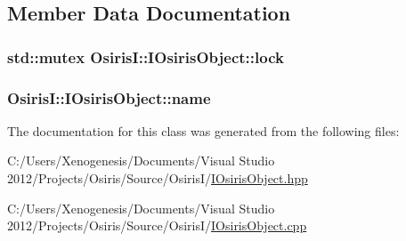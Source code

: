 \subsection{Member Data Documentation}
\hypertarget{class_osiris_i_1_1_i_osiris_object_a665623f1dafeec47b919f298a631ea61}{
\subsubsection[{lock}]{\setlength{\rightskip}{0pt plus 5cm}std\-::mutex Osiris\-I\-::\-I\-Osiris\-Object\-::lock\hspace{0.3cm}{\ttfamily [protected]}}}\label{class_osiris_i_1_1_i_osiris_object_a665623f1dafeec47b919f298a631ea61}
\hypertarget{class_osiris_i_1_1_i_osiris_object_a6a3324b9c5ea3afabc9f3ffd9b666db9}{
\subsubsection[{name}]{ Osiris\-I\-::\-I\-Osiris\-Object\-::name\hspace{0.3cm}{\ttfamily [protected]}}}\label{class_osiris_i_1_1_i_osiris_object_a6a3324b9c5ea3afabc9f3ffd9b666db9}


The documentation for this class was generated from the following files\-:\begin{DoxyCompactItemize}
\item 
C\-:/\-Users/\-Xenogenesis/\-Documents/\-Visual Studio 2012/\-Projects/\-Osiris/\-Source/\-Osiris\-I/\hyperlink{_i_osiris_object_8hpp}{I\-Osiris\-Object.\-hpp}\item 
C\-:/\-Users/\-Xenogenesis/\-Documents/\-Visual Studio 2012/\-Projects/\-Osiris/\-Source/\-Osiris\-I/\hyperlink{_i_osiris_object_8cpp}{I\-Osiris\-Object.\-cpp}\end{DoxyCompactItemize}

